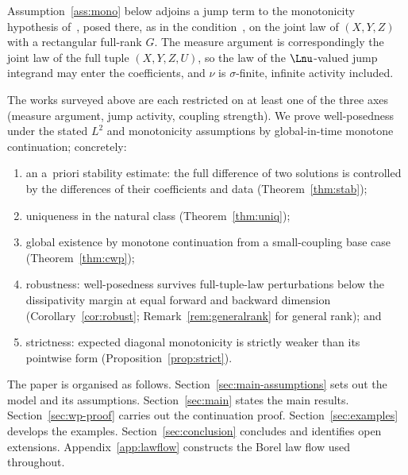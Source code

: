 Assumption~\ref{ass:mono} below adjoins a jump term to the monotonicity hypothesis
of~\cite[(H.1)(1)]{RSZ}, posed there, as in the condition~\cite[(A1)]{BYZ}, on the joint
law of $(X,Y,Z)$ with a rectangular full-rank $G$. The measure argument is correspondingly the joint law of the full tuple
$(X,Y,Z,U)$, so the law of the $\Lnu$-valued jump integrand may enter the coefficients, and
$\nu$ is $\sigma$-finite, infinite activity included.

The works surveyed above are each restricted
on at least one of the three axes (measure argument, jump activity, coupling strength). We
prove well-posedness under the stated $L^2$ and monotonicity assumptions by global-in-time
monotone continuation; concretely:
\begin{enumerate}[label=(\roman*)]
\item an a~priori stability estimate: the full difference of two solutions is
  controlled by the differences of their coefficients and data (Theorem~\ref{thm:stab});
\item uniqueness in the natural class (Theorem~\ref{thm:uniq});
\item global existence by monotone continuation from a small-coupling base case
  (Theorem~\ref{thm:cwp});
\item robustness: well-posedness survives full-tuple-law perturbations below the
  dissipativity margin at equal forward and backward dimension
  (Corollary~\ref{cor:robust}; Remark~\ref{rem:generalrank} for general rank); and
\item strictness: expected diagonal monotonicity is strictly weaker than its pointwise
  form (Proposition~\ref{prop:strict}).
\end{enumerate}

The paper is organised as follows. Section~\ref{sec:main-assumptions} sets out the model
and its assumptions. Section~\ref{sec:main} states the main results.
Section~\ref{sec:wp-proof} carries out the continuation proof.
Section~\ref{sec:examples} develops the examples. Section~\ref{sec:conclusion} concludes
and identifies open extensions.
Appendix~\ref{app:lawflow} constructs the Borel law flow used throughout.

